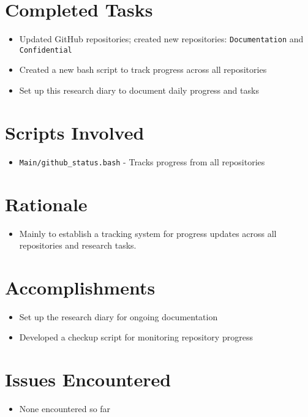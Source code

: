 \documentclass[11pt]{article}
\newcommand{\done}{\checkmark}  %
\begin{document}
	\section{Completed Tasks}
	\begin{itemize}
		\item [\done] Updated GitHub repositories; created new repositories: \texttt{Documentation} and \texttt{Confidential}
		\item [\done] Created a new bash script to track progress across all repositories
		\item [\done] Set up this research diary to document daily progress and tasks
	\end{itemize}
	
	\section{Scripts Involved}
	\begin{itemize}
		\item \texttt{Main/github\_status.bash} - Tracks progress from all repositories
	\end{itemize}
	
	\section{Rationale}
	\begin{itemize}
		\item Mainly to establish a tracking system for progress updates across all repositories and research tasks.
	\end{itemize}
	
	\section{Accomplishments}
	\begin{itemize}
		\item [\done] Set up the research diary for ongoing documentation
		\item [\done] Developed a checkup script for monitoring repository progress
	\end{itemize}
	
	\section{Issues Encountered}
	\begin{itemize}
		\item None encountered so far
	\end{itemize}
	
\end{document}
